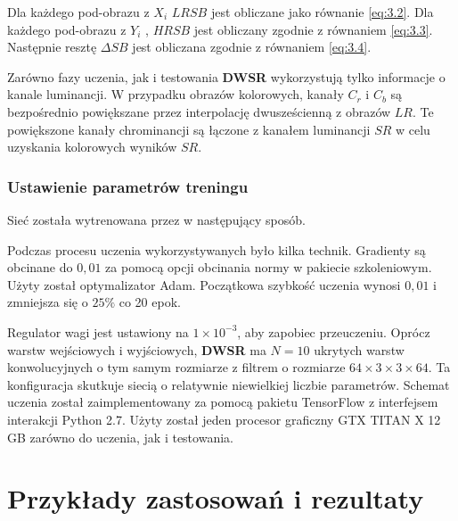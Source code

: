 Dla każdego pod-obrazu z $X_i$ $LRSB$ jest obliczane jako równanie \ref{eq:3.2}. Dla każdego pod-obrazu z $Y_i$ , $HRSB$ jest obliczany zgodnie z równaniem \ref{eq:3.3}. Następnie resztę $\Delta SB$ jest obliczana zgodnie z równaniem \ref{eq:3.4}.

Zarówno fazy uczenia, jak i testowania \textbf{DWSR} \cite{guo2017deep} wykorzystują tylko informacje o kanale luminancji. W przypadku obrazów kolorowych, kanały $C_r$ i $C_b$ są bezpośrednio powiększane przez interpolację dwusześcienną z obrazów $LR$. Te powiększone kanały chrominancji są łączone z kanałem luminancji $SR$ w celu uzyskania kolorowych wyników $SR$.


\subsubsection*{Ustawienie parametrów treningu}

Sieć została wytrenowana przez \cite{guo2017deep} w następujący sposób.

Podczas procesu uczenia wykorzystywanych było kilka technik. Gradienty są obcinane do $0,01$ za pomocą opcji obcinania normy w pakiecie szkoleniowym. Użyty został optymalizator Adam. Początkowa szybkość uczenia wynosi $0,01$ i zmniejsza się o $25\%$ co 20 epok. 

Regulator wagi jest ustawiony na $1 \times 10^{-3}$, aby zapobiec przeuczeniu. Oprócz warstw wejściowych i wyjściowych, \textbf{DWSR} ma $N = 10$ ukrytych warstw konwolucyjnych o tym samym rozmiarze z filtrem o rozmiarze $64 \times 3 \times 3 \times 64$. Ta konfiguracja skutkuje siecią o relatywnie niewielkiej liczbie parametrów. Schemat uczenia został zaimplementowany za pomocą pakietu TensorFlow z interfejsem interakcji Python 2.7. Użyty został jeden procesor graficzny GTX TITAN X 12 GB zarówno do uczenia, jak i testowania.


\section{Przykłady zastosowań i rezultaty}


